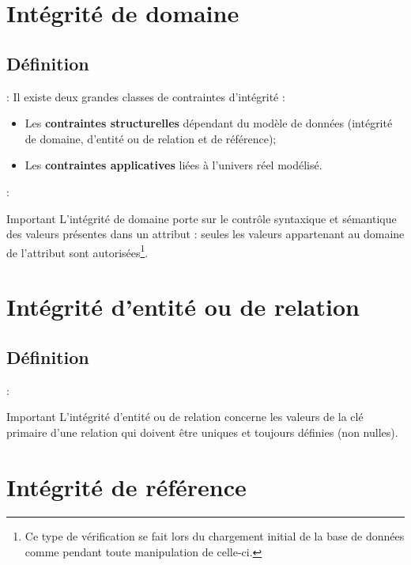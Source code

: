 \documentclass[10pt]{beamer}
\begin{document}
\section{Intégrité de domaine}
\subsection{Définition}
\begin{frame}{\secname : \subsecname}
    Il existe deux grandes classes de contraintes d’intégrité :
    \begin{itemize}
        \item Les \textbf{contraintes structurelles} dépendant du modèle de données (intégrité de domaine, d’entité ou de relation et de référence);
        \item Les \textbf{contraintes applicatives} liées à l’univers réel modélisé.
    \end{itemize}
\end{frame}

\begin{frame}{\secname : \subsecname}
    \begin{alertblock}{Important}
        L’intégrité de domaine porte sur le contrôle syntaxique et sémantique des valeurs présentes dans un attribut : seules les valeurs appartenant au domaine de l’attribut sont autorisées\footnote{Ce type de vérification se fait lors du chargement initial de la base de données comme pendant toute manipulation de celle-ci.}.
    \end{alertblock}
\end{frame}

\section{Intégrité d’entité ou de relation}
\subsection{Définition}
\begin{frame}{\secname : \subsecname}
    \begin{alertblock}{Important}
        L’intégrité d’entité ou de relation concerne les valeurs de la clé primaire d’une relation qui doivent être uniques et toujours définies (non nulles).
    \end{alertblock}
\end{frame}

\section{Intégrité de référence}
\end{document}

